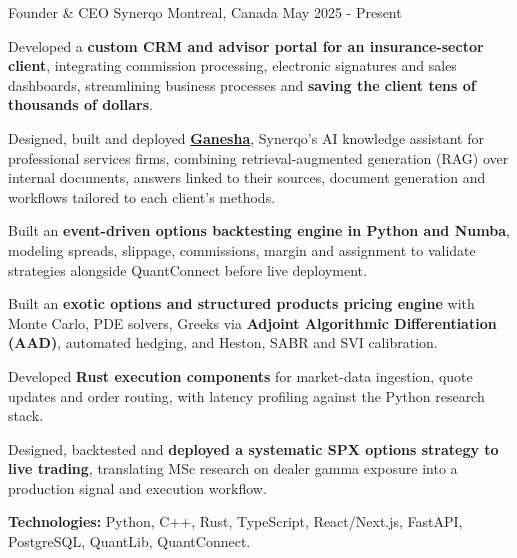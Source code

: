 \begin{cventries}

  \cventry
    {Founder \& CEO}
    {Synerqo}
    {Montreal, Canada}
    {May 2025 - Present}
    {
      \begin{cvitems}
        \item{Developed a \textbf{custom CRM and advisor portal for an insurance-sector client}, integrating commission processing, electronic signatures and sales dashboards, streamlining business processes and \textbf{saving the client tens of thousands of dollars}.}
        \item{Designed, built and deployed \textbf{\href{https://ganesha.synerqo.com}{Ganesha}}, Synerqo's AI knowledge assistant for professional services firms, combining retrieval-augmented generation (RAG) over internal documents, answers linked to their sources, document generation and workflows tailored to each client's methods.}
        \item{Built an \textbf{event-driven options backtesting engine in Python and Numba}, modeling spreads, slippage, commissions, margin and assignment to validate strategies alongside QuantConnect before live deployment.}
        \item{Built an \textbf{exotic options and structured products pricing engine} with Monte Carlo, PDE solvers, Greeks via \textbf{Adjoint Algorithmic Differentiation (AAD)}, automated hedging, and Heston, SABR and SVI calibration.}
        \item{Developed \textbf{Rust execution components} for market-data ingestion, quote updates and order routing, with latency profiling against the Python research stack.}
        \item{Designed, backtested and \textbf{deployed a systematic SPX options strategy to live trading}, translating MSc research on dealer gamma exposure into a production signal and execution workflow.}
        \item{\textbf{Technologies:} Python, C++, Rust, TypeScript, React/Next.js, FastAPI, PostgreSQL, QuantLib, QuantConnect.}
      \end{cvitems}
    }


\end{cventries}
